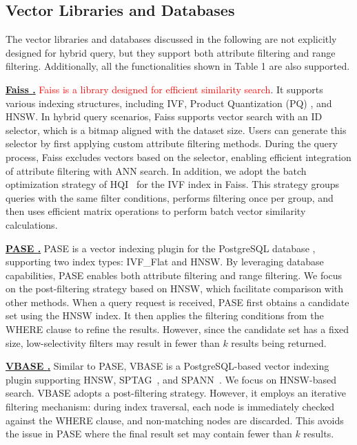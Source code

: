 \documentclass[sigconf, nonacm]{acmart}
\begin{document}
	
	
	\subsection{Vector Libraries and Databases}
	
	The vector libraries and databases discussed in the following are not explicitly designed for hybrid query, but they support both attribute filtering and range filtering. Additionally, all the functionalities shown in Table 1 are also supported.
	
	\noindent\textbf{\underline{Faiss \cite{Faiss}.}} \textcolor{red}{Faiss is a library designed for efficient similarity search}. It supports various indexing structures, including IVF, Product Quantization (PQ) \cite{PQ}, and HNSW. In hybrid query scenarios, Faiss supports vector search with an ID selector, which is a bitmap aligned with the dataset size. Users can generate this selector by first applying custom attribute filtering methods. During the query process, Faiss excludes vectors based on the selector, enabling efficient integration of attribute filtering with ANN search. In addition, we adopt the batch optimization strategy of HQI~\cite{HQI} for the IVF index in Faiss. This strategy groups queries with the same filter conditions, performs filtering once per group, and then uses efficient matrix operations to perform batch vector similarity calculations.
	
	
	\noindent\textbf{\underline{PASE \cite{pase}.}}  
	PASE is a vector indexing plugin for the PostgreSQL database \cite{postgresql13.4}, supporting two index types: IVF\_Flat \cite{johnson2019billion} and HNSW. By leveraging database capabilities, PASE enables both attribute filtering and range filtering. We focus on the post-filtering strategy based on HNSW, which facilitate comparison with other methods. When a query request is received, PASE first obtains a candidate set using the HNSW index. It then applies the filtering conditions from the WHERE clause to refine the results. However, since the candidate set has a fixed size, low-selectivity filters may result in fewer than $k$ results being returned.
	
	
	\noindent\textbf{\underline{VBASE \cite{vbase}.}}  
	Similar to PASE, VBASE is a PostgreSQL-based vector indexing plugin supporting HNSW, SPTAG~\cite{sptag}, and SPANN~\cite{spann}. We focus on HNSW-based search. VBASE adopts a post-filtering strategy. However, it employs an iterative filtering mechanism: during index traversal, each node is immediately checked against the WHERE clause, and non-matching nodes are discarded. This avoids the issue in PASE where the final result set may contain fewer than $k$ results.
	
\end{document}
